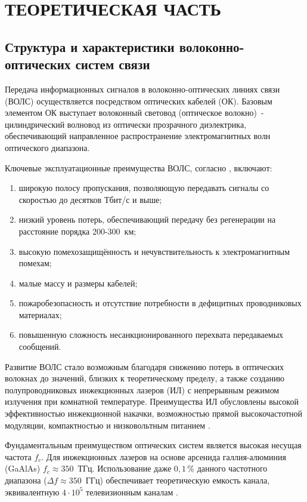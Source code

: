 \section{ТЕОРЕТИЧЕСКАЯ ЧАСТЬ}

\subsection{Структура и характеристики волоконно-оптических систем связи}

Передача информационных сигналов в волоконно-оптических линиях связи (ВОЛС) осуществляется посредством оптических кабелей (ОК). Базовым элементом ОК выступает волоконный световод (оптическое волокно)~- цилиндрический волновод из оптически прозрачного диэлектрика, обеспечивающий направленное распространение электромагнитных волн оптического диапазона.

Ключевые эксплуатационные преимущества ВОЛС, согласно \cite{Slepov,Burdin}, включают:
\begin{enumerate}
    \item широкую полосу пропускания, позволяющую передавать сигналы со скоростью до десятков Тбит/с и выше;
    \item низкий уровень потерь, обеспечивающий передачу без регенерации на расстояние порядка 200-300~км;
    \item высокую помехозащищённость и нечувствительность к электромагнитным помехам;
    \item малые массу и размеры кабелей;
    \item пожаробезопасность и отсутствие потребности в дефицитных проводниковых материалах;
    \item повышенную сложность несанкционированного перехвата передаваемых сообщений.
\end{enumerate}

Развитие ВОЛС стало возможным благодаря снижению потерь в оптических волокнах до значений, близких к теоретическому пределу, а также созданию полупроводниковых инжекционных лазеров (ИЛ) с непрерывным режимом излучения при комнатной температуре. Преимущества ИЛ обусловлены высокой эффективностью инжекционной накачки, возможностью прямой высокочастотной модуляции, компактностью и низковольтным питанием \cite{Slepov}.

Фундаментальным преимуществом оптических систем является высокая несущая частота $f_c$. Для инжекционных лазеров на основе арсенида галлия-алюминия (GaAlAs) $f_c \approx 350$~ТГц. Использование даже $0{,}1\,\%$ данного частотного диапазона ($\Delta f \approx 350$~ГГц) обеспечивает теоретическую емкость канала, эквивалентную $4 \cdot 10^5$ телевизионным каналам \cite{Slepov}.


